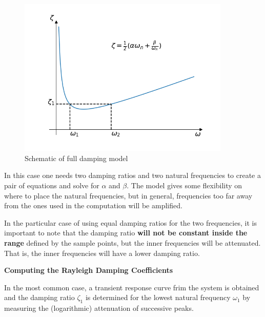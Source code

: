 \documentclass[10pt,b5paper,titlepage]{book}
\begin{document}
\begin{figure}[ht]
    \centering
    \includegraphics[width=0.90\textwidth]{img/general_rayleigh_damping.png}
    \caption{Schematic of full damping model}
    \label{fig:general-rayleigh-damping-png}
\end{figure}

In this case one needs two damping ratios and two natural frequencies to create
a pair of equations and solve for $ \alpha $ and $ \beta $. The model gives some
flexibility on where to place the natural frequencies, but in general, frequencies
too far away from the ones used in the computation will be amplified.

In the particular case of using equal damping ratios for the two frequencies,
it is important to note that the damping ratio \textbf{will not be constant inside the range}
defined by the sample points, but the inner frequencies will be attenuated. That is,
the inner frequencies will have a lower damping ratio.

\textbf{Computing the Rayleigh Damping Coefficients}

In the most common case, a transient response curve frim the system is obtained and
the damping ratio $ \zeta_1 $ is determined for the lowest natural frequency
$ \omega_1 $ by measuring the (logarithmic) attenuation of successive peaks.
\end{document}
